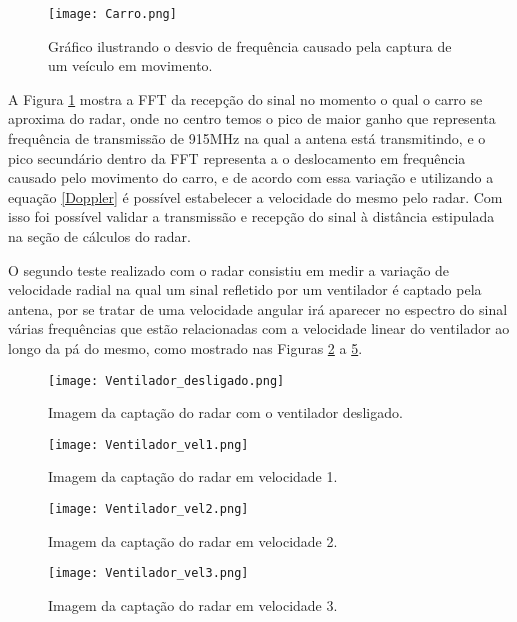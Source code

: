 \begin{figure}[H]
    \centering
    \texttt{[image: Carro.png]}
    \caption{Gráfico ilustrando o desvio de frequência causado pela captura de um veículo em movimento.}
    \label{TVeiculo}
\end{figure}

A Figura \ref{TVeiculo} mostra a FFT da recepção do sinal no momento o qual o carro se aproxima do radar,
onde no centro temos o pico de maior ganho que representa frequência de transmissão de 915MHz na qual a antena está transmitindo, e o pico secundário dentro da FFT representa a o deslocamento em frequência causado pelo movimento do carro, e de acordo com essa variação e utilizando a equação \ref{Doppler} é possível estabelecer a velocidade do mesmo pelo radar.
Com isso foi possível validar a transmissão e recepção do sinal à distância estipulada na seção de cálculos do radar. 

O segundo teste realizado com o radar consistiu em
medir a variação de velocidade radial na qual um sinal refletido por um ventilador é captado pela antena, por se tratar de uma velocidade angular irá aparecer no espectro do sinal várias frequências que estão relacionadas com a velocidade linear do ventilador ao longo da pá do mesmo, como mostrado nas Figuras \ref{Vel0} a \ref{Vel3}.


\begin{figure}[H]
    \centering
    \texttt{[image: Ventilador\_desligado.png]}
    \caption{Imagem da captação do radar com o ventilador desligado.}
    \label{Vel0}
\end{figure}

\begin{figure}[H]
    \centering
    \texttt{[image: Ventilador\_vel1.png]}
    \caption{Imagem da captação do radar em velocidade 1.}
    \label{Vel1}
\end{figure}
      
\begin{figure}[H]
    \centering
    \texttt{[image: Ventilador\_vel2.png]}
    \caption{Imagem da captação do radar em velocidade 2.}
    \label{Vel2}
\end{figure}

\begin{figure}[H]
    \centering
    \texttt{[image: Ventilador\_vel3.png]}
    \caption{Imagem da captação do radar em velocidade 3.}
    \label{Vel3}
\end{figure}

